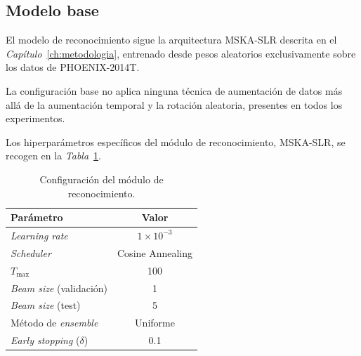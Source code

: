 \subsection{Modelo base}
El modelo de reconocimiento sigue la arquitectura MSKA-SLR descrita en el \textit{Capítulo}~\ref{ch:metodologia}, entrenado desde pesos aleatorios exclusivamente sobre los datos de PHOENIX-2014T\@.

La configuración base no aplica ninguna técnica de aumentación de datos más allá de la aumentación temporal y la rotación aleatoria, presentes en todos los experimentos.

Los hiperparámetros específicos del módulo de reconocimiento, MSKA-SLR, se recogen en la \textit{Tabla}~\ref{tab:slr_config}.
\begin{table}[H]
	\centering
	\begin{tabular}{lc}
		\hline
		\textbf{Parámetro}                  & \textbf{Valor}        \\ \hline
		\textit{Learning rate}              & $1 \times 10^{-3}$    \\
		\textit{Scheduler}                  & Cosine Annealing      \\
		$T_{\max}$                          & 100                   \\
		\textit{Beam size} (validación)     & 1                     \\
		\textit{Beam size} (test)           & 5                     \\
		Método de \textit{ensemble}         & Uniforme              \\
		\textit{Early stopping} ($\delta$)  & 0.1                   \\ \hline
	\end{tabular}
	\caption{Configuración del módulo de reconocimiento.}
	\label{tab:slr_config}
\end{table}

